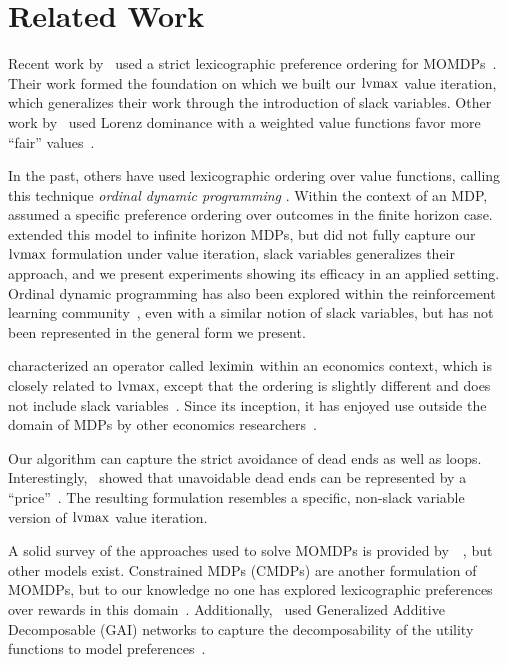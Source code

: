 \section{Related Work}
\label{sec:related_work}

Recent work by~\citeauthor{Mouaddib04-MultiObjectivePathPlanning} used a strict lexicographic preference ordering for MOMDPs~\cite{Mouaddib04-MultiObjectivePathPlanning}. Their work formed the foundation on which we built our $\operatorname*{lvmax}$ value iteration, which generalizes their work through the introduction of slack variables. Other work by~\citeauthor{Perny13-LorenzOptimalSolutionsMOMDPs} used Lorenz dominance with a weighted value functions favor more ``fair'' values~\cite{Perny13-LorenzOptimalSolutionsMOMDPs}.

In the past, others have used lexicographic ordering over value functions, calling this technique \emph{ordinal dynamic programming} \cite{Mitten74-PreferenceOrderDynamicProgramming,Sobel75-OrdinalDynamicProgramming}. Within the context of an MDP, \citeauthor{Mitten74-PreferenceOrderDynamicProgramming} assumed a specific preference ordering over outcomes in the finite horizon case. \citeauthor{Sobel75-OrdinalDynamicProgramming} extended this model to infinite horizon MDPs, but did not fully capture our $\operatorname*{lvmax}$ formulation under value iteration, slack variables generalizes their approach, and we present experiments showing its efficacy in an applied setting. Ordinal dynamic programming has also been explored within the reinforcement learning community~\cite{Gabor98-MultiObjectiveReinforcementLearning,Natarajan05-DynamicPreferencesMultiCriteriaRL}, even with a similar notion of slack variables, but has not been represented in the general form we present.

\citeauthor{Barbara88-MaxminLeximax} characterized an operator called $\operatorname*{leximin}$ within an economics context, which is closely related to $\operatorname*{lvmax}$, except that the ordering is slightly different and does not include slack variables~\cite{Barbara88-MaxminLeximax}. Since its inception, it has enjoyed use outside the domain of MDPs by other economics researchers~\cite{Bossert94-RankingOpportunitySets,Fargier05-QuantitativeDecisionMaking,Arlegi05-FreedomOfChoice}.

Our algorithm can capture the strict avoidance of dead ends as well as loops. Interestingly,~\citeauthor{Kolobov12-TheoryGoalOrientedMDPsDeadEnds} showed that unavoidable dead ends can be represented by a ``price''~\cite{Kolobov12-TheoryGoalOrientedMDPsDeadEnds}. The resulting formulation resembles a specific, non-slack variable version of $\operatorname*{lvmax}$ value iteration.

A solid survey of the approaches used to solve MOMDPs is provided by~\citeauthor{Roijers13-SurveyMultiObjective}~, but other models exist. Constrained MDPs (CMDPs) are another formulation of MOMDPs, but to our knowledge no one has explored lexicographic preferences over rewards in this domain~\cite{Altman99-CMDPs}. Additionally,~\citeauthor{Gonzales11-DecisionMakingMultipleObjectivesGAINetworks} used Generalized Additive Decomposable (GAI) networks to capture the decomposability of the utility functions to model preferences~\cite{Gonzales11-DecisionMakingMultipleObjectivesGAINetworks}.
